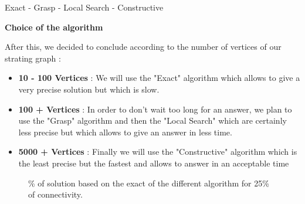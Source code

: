 Exact - Grasp - Local Search - Constructive \bigskip 

\large\textbf{Choice of the algorithm} \newline

After this, we decided to conclude according to the number of vertices of our strating graph :

\begin{itemize}
    \item \textbf{10 - 100 Vertices} : We will use the "Exact" algorithm which allows to give a very precise solution but which is slow.

    \item \textbf{100 + Vertices} : In order to don't wait too long for an answer, we plan to use the "Grasp" algorithm and then the "Local Search" which are certainly less precise but which allows to give an answer in less time.

    \item \textbf{5000 + Vertices} : Finally we will use the "Constructive" algorithm which is the least precise but the fastest and allows to answer in an acceptable time

\end{itemize}

\begin{figure}[H]
    \centering
    \caption{\% of solution based on the exact of the different algorithm for 25\% of connectivity.}
    \label{fig:algorithm_25_time}
\end{figure}

